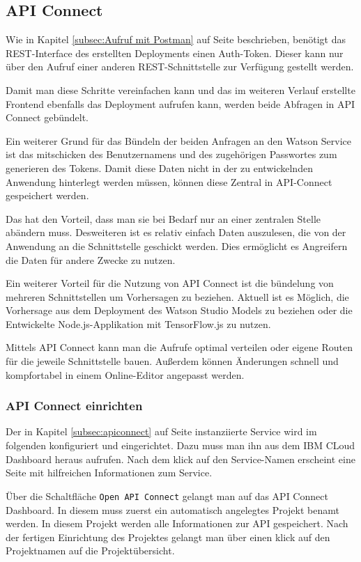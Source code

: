 \subsection{API Connect}
Wie in Kapitel \ref{subsec:Aufruf mit Postman} auf Seite \pageref{subsec:Aufruf mit Postman} beschrieben, benötigt das
REST-Interface des erstellten Deployments einen Auth-Token. Dieser kann nur über den Aufruf einer anderen
REST-Schnittstelle zur Verfügung gestellt werden.

Damit man diese Schritte vereinfachen kann und das im weiteren Verlauf erstellte Frontend ebenfalls das Deployment aufrufen
kann, werden beide Abfragen in API Connect gebündelt.

Ein weiterer Grund für das Bündeln der beiden Anfragen an den Watson Service ist das mitschicken des Benutzernamens und
des zugehörigen Passwortes zum generieren des Tokens. Damit diese Daten nicht in der zu entwickelnden Anwendung hinterlegt
werden müssen, können diese Zentral in API-Connect gespeichert werden.

Das hat den Vorteil, dass man sie bei Bedarf nur an einer zentralen Stelle abändern muss. Desweiteren ist es relativ
einfach Daten auszulesen, die von der Anwendung an die Schnittstelle geschickt werden. Dies ermöglicht es Angreifern die
Daten für andere Zwecke zu nutzen.

Ein weiterer Vorteil für die Nutzung von API Connect ist die bündelung von mehreren Schnittstellen um Vorhersagen zu
beziehen. Aktuell ist es Möglich, die Vorhersage aus dem Deployment des Watson Studio Models zu beziehen oder die
Entwickelte Node.js-Applikation mit TensorFlow.js zu nutzen.

Mittels API Connect kann man die Aufrufe optimal verteilen oder eigene Routen für die jeweile Schnittstelle bauen.
Außerdem können Änderungen schnell und kompfortabel in einem Online-Editor angepasst werden.

\subsubsection{API Connect einrichten}
Der in Kapitel \ref{subsec:apiconnect} auf Seite \pageref{subsec:apiconnect} instanziierte Service wird im folgenden
konfiguriert und eingerichtet. Dazu muss man ihn aus dem IBM CLoud Dashboard heraus aufrufen. Nach dem klick auf den
Service-Namen erscheint eine Seite mit hilfreichen Informationen zum Service.

Über die Schaltfläche \texttt{Open API Connect} gelangt man auf das API Connect Dashboard. In diesem muss zuerst ein
automatisch angelegtes Projekt benamt werden. In diesem Projekt werden alle Informationen zur API gespeichert. Nach der
fertigen Einrichtung des Projektes gelangt man über einen klick auf den Projektnamen auf die Projektübersicht.

